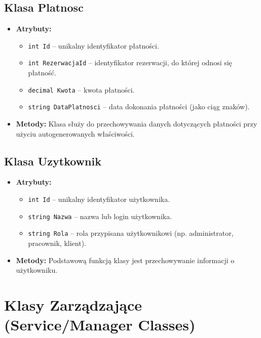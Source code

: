 \subsection*{Klasa \textbf{Platnosc}}
\begin{itemize}
    \item \textbf{Atrybuty:}
    \begin{itemize}
        \item \texttt{int Id} -- unikalny identyfikator płatności.
        \item \texttt{int RezerwacjaId} -- identyfikator rezerwacji, do której odnosi się płatność.
        \item \texttt{decimal Kwota} -- kwota płatności.
        \item \texttt{string DataPlatnosci} -- data dokonania płatności (jako ciąg znaków).
    \end{itemize}
    \item \textbf{Metody:}  
    Klasa służy do przechowywania danych dotyczących płatności przy użyciu autogenerowanych właściwości.
\end{itemize}

\subsection*{Klasa \textbf{Uzytkownik}}
\begin{itemize}
    \item \textbf{Atrybuty:}
    \begin{itemize}
        \item \texttt{int Id} -- unikalny identyfikator użytkownika.
        \item \texttt{string Nazwa} -- nazwa lub login użytkownika.
        \item \texttt{string Rola} -- rola przypisana użytkownikowi (np. administrator, pracownik, klient).
    \end{itemize}
    \item \textbf{Metody:}  
    Podstawową funkcją klasy jest przechowywanie informacji o użytkowniku.
\end{itemize}

\section{Klasy Zarządzające (Service/Manager Classes)}
